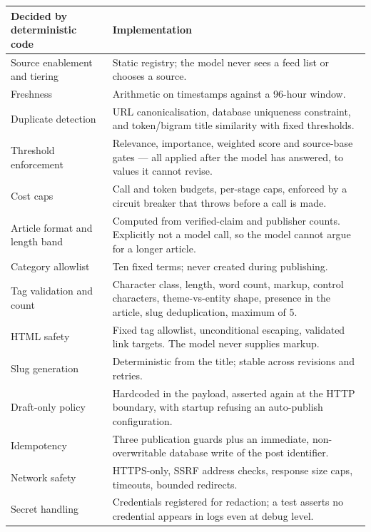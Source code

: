 \documentclass[11pt,a4paper]{article}
\begin{document}
\begin{center}
\small
\begin{tabularx}{\textwidth}{@{}>{\RaggedRight}p{5.3cm} >{\RaggedRight}X@{}}
\toprule
\textcolor{aitkGo}{\textbf{Decided by deterministic code}} & \textbf{Implementation} \\
\midrule
Source enablement and tiering & Static registry; the model never sees a feed list
  or chooses a source. \\
Freshness & Arithmetic on timestamps against a 96-hour window. \\
Duplicate detection & URL canonicalisation, database uniqueness constraint, and
  token/bigram title similarity with fixed thresholds. \\
Threshold enforcement & Relevance, importance, weighted score and source-base gates
  --- all applied after the model has answered, to values it cannot revise. \\
Cost caps & Call and token budgets, per-stage caps, enforced by a circuit breaker
  that throws before a call is made. \\
Article format and length band & Computed from verified-claim and publisher counts.
  Explicitly not a model call, so the model cannot argue for a longer article. \\
Category allowlist & Ten fixed terms; never created during publishing. \\
Tag validation and count & Character class, length, word count, markup, control
  characters, theme-vs-entity shape, presence in the article, slug deduplication,
  maximum of 5. \\
HTML safety & Fixed tag allowlist, unconditional escaping, validated link targets.
  The model never supplies markup. \\
Slug generation & Deterministic from the title; stable across revisions and
  retries. \\
Draft-only policy & Hardcoded in the payload, asserted again at the HTTP boundary,
  with startup refusing an auto-publish configuration. \\
Idempotency & Three publication guards plus an immediate, non-overwritable
  database write of the post identifier. \\
Network safety & HTTPS-only, SSRF address checks, response size caps, timeouts,
  bounded redirects. \\
Secret handling & Credentials registered for redaction; a test asserts no
  credential appears in logs even at debug level. \\
\bottomrule
\end{tabularx}
\end{center}
\end{document}
